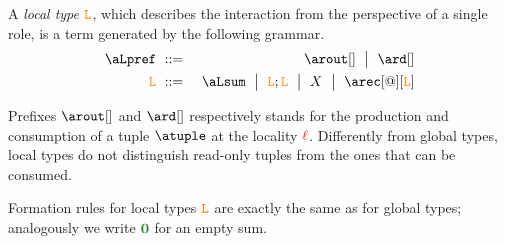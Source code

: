 %

A {\em local type} $\texttt{\textcolor{orange}L}$, which describes the interaction from the perspective of a single 
role,  is a term generated by the following grammar.
\begin{eqnarray*}
  \aLpref & \bnfdef &
                  \arout[]\bnfmid
                  \ard[] 
\\
  \aL & \bnfdef &
                  \aLsum \bnfmid
                  \aL; \aL \bnfmid
                  X \bnfmid
                  \arec[@][\aL]
\end{eqnarray*}


Prefixes $\arout[]$  and $\ard[]$ respectively stands for the production and consumption 
of a tuple $\atuple$ at the locality ${\color{red}\ell}$. Differently from global types, local types 
do not distinguish  read-only tuples from the ones that can be consumed.

Formation rules for local types $\texttt{\textcolor{orange}L}$ are exactly the same as for 
global types; analogously we write $\nil$ for an empty sum. 

